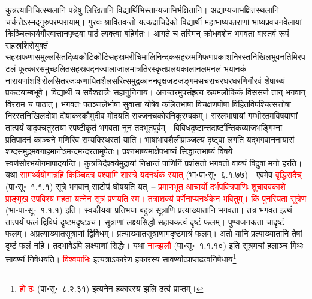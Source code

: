 \begin{sloppypar}
कुत्रत्यानि\-चित्स्थलानि पत्रेषु लिखितानि विद्यार्थिभिस्तान्यजाभिर्भक्षितानि। अद्याप्यजा\-भक्षित\-स्थलानि चर्चन्तेऽस्मद्गुरु\-परम्परायाम्। गुरवः श्रावितवन्तो यत्कदाचिदेको विद्यार्थी महाभाष्य\-काराणां भाष्य\-प्रवचन\-वेलायां किञ्चित्कार्य\-गौरवात्तानपृष्ट्वा पाठं त्यक्त्वा बहिर्गतः। आगते च तस्मिन् क्रोध\-वशेन भगवता वास्तवं रूपं सहस्र\-शिरो\-युक्तं सहस्र\-फणा\-समुल्लसित\-दिव्य\-कोटि\-कोटि\-सहस्र\-मरीचि\-मालि\-निन्दक\-सहस्र\-मणि\-फण\-प्रकाश\-निरस्त\-निखिल\-भुवन\-तिमिर\-पटलं फूत्कार\-समुच्छलित\-सहस्र\-वदन\-ज्वाला\-जाल\-मात्र\-तिरस्कृत\-प्रलय\-कालानलमनलं भयानकं नारायणांश\-शिरो\-लसित\-रजः\-कणायित\-शैल\-सरित्समुद्र\-कानन\-वृक्ष\-जड\-जङ्गम\-सचराचर\-धर\-धरणि\-गौरवं शेषाख्यं प्रकटयाम्बभूवे। विद्यार्थी च सर्वैश्छात्त्रैः सहानुनिनाय। अनन्तरमुपसंहृत्य रूपमलौकिकं विससर्ज तान् भगवान् विरराम च पाठात्। भगवतः पतञ्जलेर्भाषा सुवासा योषेव कलित\-भाषा विचक्षण\-पोषा विहित\-विपश्चित्सत्तोषा निरस्त\-निखिल\-दोषा दोषाकर\-कौमुदीव मोदयति सज्जन\-चकोर\-निकुरम्बकम्। सरल\-भाषायां गम्भीरतम\-विषयाणां तात्पर्यं यादृक्चतुरतया स्पष्टीकृतं भगवता नूनं तदभूतपूर्वम्। विविध\-दृष्टान्त\-दार्ष्टान्तिक\-व्याज\-भङ्गिम्ना प्रतिपादनं काञ्चने मणिरिव सम्यक्स्थिरतां याति। भाषा\-भाव\-शैली\-प्राञ्जल्यं दृष्ट्वा लगति यद्भगवाननायासं शब्द\-समुद्रमवगाहमानोऽमन्द\-मन्दरतामुपेतः। प्रश्न\-भाष्यमाक्षेप\-भाष्यं सिद्धान्त\-भाष्यं विषये स्वर्ण\-सौरभ\-योगमापादयन्ति। कुत्रचिदैश्वर्य\-मुद्रायां निभ्रान्तं पाणिनिं प्रशंसतो भगवतो वाक्यं विदुषां मनो हरति। यथा \textcolor{red}{सामर्थ्य\-योगान्नहि किञ्चिदत्र पश्यामि शास्त्रे यदनर्थकं स्यात्} (भा॰पा॰सू॰~६.१.७७)। एवमेव \textcolor{red}{वृद्धिरादैच्} (पा॰सू॰~१.१.१) सूत्रे भगवान् साटोपं घोषयति यत्~– \textcolor{red}{प्रमाणभूत आचार्यो दर्भपवित्रपाणिः शुचाववकाशे प्राङ्मुख उपविश्य महता यत्नेन सूत्रं प्रणयति स्म। तत्राशक्यं वर्णेनाप्यनर्थकेन भवितुम्। किं पुनरियता सूत्रेण} (भा॰पा॰सू॰~१.१.१) इति। स्वकीयया प्रतिभया बहुत्र सूत्राणि प्रत्याख्यातानि भगवता। तत्र भगवत इत्थं तात्पर्यं फलं द्विविधं दृष्टमदृष्टञ्च। सूत्राणां लक्ष्य\-सिद्धौ सहायकत्वं दृष्टं फलम्। पुण्य\-जनकता चादृष्टं फलम्। अप्रत्याख्यात\-सूत्राणां द्विविधम्। प्रत्याख्यात\-सूत्राणामदृष्टमात्रं फलम्। अतो यानि प्रत्याख्यातानि तेषां दृष्टं फलं नहि। तदभावेऽपि लक्ष्याणां सिद्धेः। यथा \textcolor{red}{नाज्झलौ} (पा॰सू॰~१.१.१०) इति सूत्रमचां हलाञ्च मिथः सावर्ण्यं निषेधयति। \textcolor{red}{विश्वपाभिः} इत्यत्राऽकारेण हकारस्य सावर्ण्यात्प्राप्त\-ढत्व\-निषेधाय\footnote{ \textcolor{red}{हो ढः} (पा॰सू॰~८.२.३१) इत्यनेन हकारस्य झलि ढत्वं प्राप्तम्।}

\end{sloppypar}
